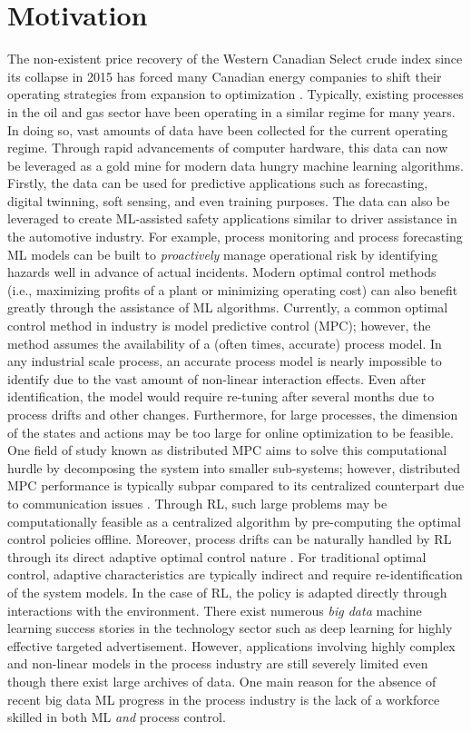 \section{Motivation}
The non-existent price recovery of the Western Canadian Select crude index since its collapse in 2015 has forced many Canadian energy companies to shift their operating strategies from expansion to optimization \cite{oil_price}.  Typically, existing processes in the oil and gas sector have been operating in a similar regime for many years.  In doing so, vast amounts of data have been collected for the current operating regime.  Through rapid advancements of computer hardware, this data can now be leveraged as a gold mine for modern data hungry machine learning algorithms.  Firstly, the data can be used for predictive applications such as forecasting, digital twinning, soft sensing, and even training purposes.  The data can also be leveraged to create ML-assisted safety applications similar to driver assistance in the automotive industry. For example, process monitoring and process forecasting ML models can be built to \textit{proactively} manage operational risk by identifying hazards well in advance of actual incidents. Modern optimal control methods (i.e., maximizing profits of a plant or minimizing operating cost) can also benefit greatly through the assistance of ML algorithms.  Currently, a common optimal control method in industry is model predictive control (MPC); however, the method assumes the availability of a (often times, accurate) process model.  In any industrial scale process, an accurate process model is nearly impossible to identify due to the vast amount of non-linear interaction effects.  Even after identification, the model would require re-tuning after several months due to process drifts and other changes. Furthermore, for large processes, the dimension of the states and actions may be too large for online optimization to be feasible. One field of study known as distributed MPC aims to solve this computational hurdle by decomposing the system into smaller sub-systems; however, distributed MPC performance is typically subpar compared to its centralized counterpart due to communication issues \cite{distributed_mpc}. Through RL, such large problems may be computationally feasible as a centralized algorithm by pre-computing the optimal control policies offline. Moreover, process drifts can be naturally handled by RL through its direct adaptive optimal control nature \cite{direct_adaptive}.  For traditional optimal control, adaptive characteristics are typically indirect and require re-identification of the system models.  In the case of RL, the policy is adapted directly through interactions with the environment. There exist numerous \textit{big data} machine learning success stories in the technology sector such as deep learning for highly effective targeted advertisement. However, applications involving highly complex and non-linear models in the process industry are still severely limited even though there exist large archives of data. One main reason for the absence of recent big data ML progress in the process industry is the lack of a workforce skilled in both ML \textit{and} process control.

